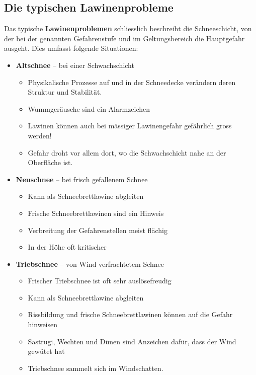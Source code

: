 \subsection{Die typischen Lawinenprobleme}

Das typische \textbf{Lawinenproblemen} schliesslich beschreibt die Schneeschicht, von der bei der genannten Gefahrenstufe und im Geltungsbereich die Hauptgefahr ausgeht.
Dies umfasst folgende Situationen:

\begin{itemize}
  \item{
    \textbf{Altschnee} -- bei einer Schwachschicht
    \begin{itemize}
      \item{Physikalische Prozesse auf und in der Schneedecke verändern deren Struktur und Stabilität.}
      \item{Wummgeräusche sind ein Alarmzeichen}
      \item{Lawinen können auch bei mässiger Lawinengefahr gefährlich gross werden!}
      \item{Gefahr droht vor allem dort, wo die Schwachschicht nahe an der Oberfläche ist.}
    \end{itemize}
  }
  \item{
    \textbf{Neuschnee} -- bei frisch gefallenem Schnee
    \begin{itemize}
      \item{Kann als Schneebrettlawine abgleiten}
      \item{Frische Schneebrettlawinen sind ein Hinweis}
      \item{Verbreitung der Gefahrenstellen meist flächig}
      \item{In der Höhe oft kritischer}
    \end{itemize}
  }
  \item{
    \textbf{Triebschnee} -- von Wind verfrachtetem Schnee
    \begin{itemize}
      \item{Frischer Triebschnee ist oft sehr auslösefreudig}
      \item{Kann als Schneebrettlawine abgleiten}
      \item{Rissbildung und frische Schneebrettlawinen können auf die Gefahr hinweisen}
      \item{Sastrugi, Wechten und Dünen sind Anzeichen dafür, dass der Wind gewütet hat}
      \item{Triebschnee sammelt sich im Windschatten.}
    \end{itemize}
}
\end{itemize}
